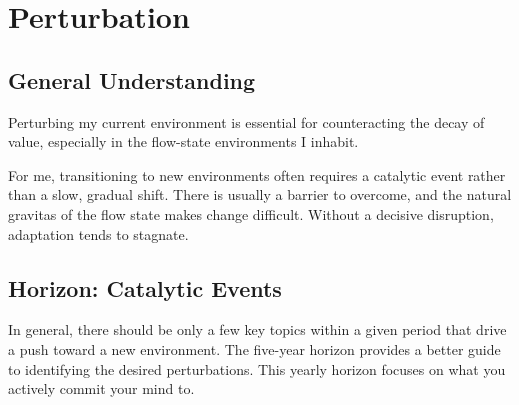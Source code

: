 \section{Perturbation}
\subsection{General Understanding}

Perturbing my current environment is essential for counteracting the decay of value, especially in the flow-state environments I inhabit.

For me, transitioning to new environments often requires a catalytic event rather than a slow, gradual shift. There is usually a barrier to overcome, and the natural gravitas of the flow state makes change difficult. Without a decisive disruption, adaptation tends to stagnate.

\subsection{Horizon: Catalytic Events}

In general, there should be only a few key topics within a given period that drive a push toward a new environment. The five-year horizon provides a better guide to identifying the desired perturbations. This yearly horizon focuses on what you actively commit your mind to.


